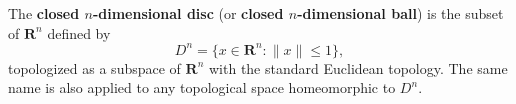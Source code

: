 The \textbf{closed $n$-dimensional disc} (or \textbf{closed $n$-dimensional ball}) is the subset of $\mathbf{R}^n$ defined by
\[
D^n = \{x \in \mathbf{R}^n : \|x\| \leq 1\},
\]
topologized as a subspace of $\mathbf{R}^n$ with the standard Euclidean topology. The same name is also applied to any topological space homeomorphic to $D^n$.
